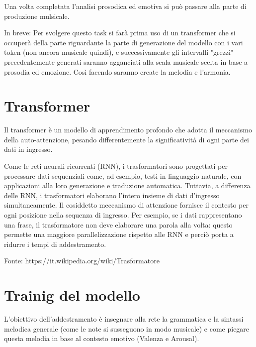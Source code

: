 Una volta completata l'analisi prosodica ed emotiva si può passare alla parte di produzione mulsicale.

In breve: Per svolgere questo task si farà prima uso di un transformer che si occuperà della parte riguardante la parte di generazione del modello con i vari token (non ancora musicale quindi), e successivamente gli intervalli "grezzi" precedentemente generati saranno agganciati alla scala musicale scelta in base a prosodia ed emozione.
Così facendo saranno create la melodia e l'armonia.



\section{Transformer}
Il transformer è un modello di apprendimento profondo che adotta il meccanismo della auto-attenzione, pesando differentemente la significatività di ogni parte dei dati in ingresso.


Come le reti neurali ricorrenti (RNN), i trasformatori sono progettati per processare dati sequenziali come, ad esempio, testi in linguaggio naturale, con applicazioni alla loro generazione e traduzione automatica. Tuttavia, a differenza delle RNN, i trasformatori elaborano l'intero insieme di dati d'ingresso simultaneamente. Il cosiddetto meccanismo di attenzione fornisce il contesto per ogni posizione nella sequenza di ingresso. Per esempio, se i dati rappresentano una frase, il trasformatore non deve elaborare una parola alla volta: questo permette una maggiore parallelizzazione rispetto alle RNN e perciò porta a ridurre i tempi di addestramento.

Fonte: https://it.wikipedia.org/wiki/Trasformatore



\section{Trainig del modello}
L'obiettivo dell'addestramento è insegnare alla rete la grammatica e la sintassi melodica generale (come le note si susseguono in modo musicale) e come piegare questa melodia in base al contesto emotivo (Valenza e Arousal).

